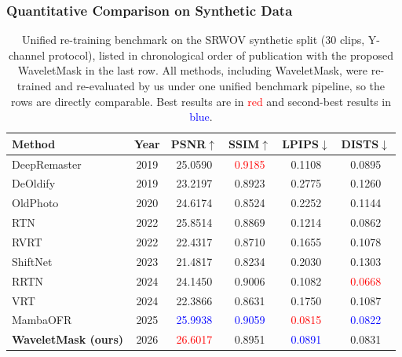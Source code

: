 \documentclass[applsci,article,submit,pdftex,moreauthors]{Definitions/mdpi}
\begin{document}
\subsubsection{Quantitative Comparison on Synthetic Data}\label{subsec:sota_quant}

\begin{table}[H]
\caption{Unified re-training benchmark on the SRWOV synthetic split (30 clips, Y-channel protocol), listed in chronological order of publication with the proposed WaveletMask in the last row. All methods, including WaveletMask, were re-trained and re-evaluated by us under one unified benchmark pipeline, so the rows are directly comparable. Best results are in \textcolor{red}{red} and second-best results in \textcolor{blue}{blue}.\label{tab:literature_context}}
\footnotesize
\begin{tabularx}{\textwidth}{lcCCCC}
\toprule
\textbf{Method} & \textbf{Year} & \textbf{PSNR$\uparrow$} & \textbf{SSIM$\uparrow$} & \textbf{LPIPS$\downarrow$} & \textbf{DISTS$\downarrow$} \\
\midrule
DeepRemaster~\cite{iizuka2019deepremaster}  & 2019 & 25.0590 & \textcolor{red}{0.9185} & 0.1108 & 0.0895 \\
DeOldify~\cite{jantic2019deoldify}          & 2019 & 23.2197 & 0.8923 & 0.2775 & 0.1260 \\
OldPhoto~\cite{wan2020bringing}             & 2020 & 24.6174 & 0.8524 & 0.2252 & 0.1144 \\
RTN~\cite{rtn2022}                          & 2022 & 25.8514 & 0.8869 & 0.1214 & 0.0862 \\
RVRT~\cite{liang2022rvrt}                   & 2022 & 22.4317 & 0.8710 & 0.1655 & 0.1078 \\
ShiftNet~\cite{li2023shiftnet}              & 2023 & 21.4817 & 0.8234 & 0.2030 & 0.1303 \\
RRTN~\cite{rrtn2024}                        & 2024 & 24.1450 & 0.9006 & 0.1082 & \textcolor{red}{0.0668} \\
VRT~\cite{liang2024vrt}                     & 2024 & 22.3866 & 0.8631 & 0.1750 & 0.1087 \\
MambaOFR~\cite{mao2025mambaofr}             & 2025 & \textcolor{blue}{25.9938} & \textcolor{blue}{0.9059} & \textcolor{red}{0.0815} & \textcolor{blue}{0.0822} \\
\midrule
\textbf{WaveletMask (ours)}                 & 2026 & \textcolor{red}{26.6017} & 0.8951 & \textcolor{blue}{0.0891} & 0.0831 \\
\bottomrule
\end{tabularx}
\normalsize
\end{table}
\end{document}
